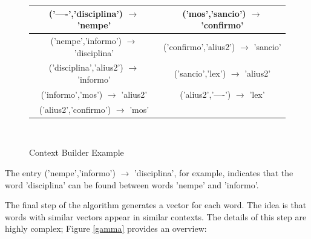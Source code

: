 \documentclass[a4paper, 12pt,notitlepage]{article} %
\newenvironment{figurecenter}{%
	\setlength\topsep{-7pt}
	\setlength\parskip{-7pt}
	\singlespacing %
	\begin{center}
	}{%
	\end{center}
\vspace{-5pt}
}
\numberwithin{dummy}{subsection}
\numberwithin{dummy}{section}
\theoremstyle{named}
\theoremstyle{definition}
\theoremstyle{definition}
\begin{document}
\begin{figure}[H]
	\begin{figurecenter}
		\begin{tabular}{| c | c |}
			\hline
			{\ttfamily ('----','disciplina')} $\rightarrow$ {\ttfamily 'nempe'} & {\ttfamily ('mos','sancio')} $\rightarrow$ {\ttfamily 'confirmo'} \\ \hline
			{\ttfamily ('nempe','informo')} $\rightarrow$ {\ttfamily 'disciplina'} & {\ttfamily ('confirmo','alius2')} $\rightarrow$ {\ttfamily 'sancio'}   \\ \hline
			{\ttfamily ('disciplina','alius2')} $\rightarrow$ {\ttfamily 'informo'} & {\ttfamily ('sancio','lex')} $\rightarrow$ {\ttfamily 'alius2'}   \\ \hline
			{\ttfamily ('informo','mos')} $\rightarrow$ {\ttfamily 'alius2'} & {\ttfamily ('alius2','----')} $\rightarrow$ {\ttfamily 'lex'}    \\ \hline
			{\ttfamily ('alius2','confirmo')} $\rightarrow$ {\ttfamily 'mos'} &    \\ \hline
		\end{tabular}\\
		\caption{Context Builder Example}
		\label{beta}
	\end{figurecenter}
\end{figure}

\noindent The entry {\ttfamily ('nempe','informo')} $\rightarrow$ {\ttfamily 'disciplina'}, for example, indicates that the word {\ttfamily 'disciplina'} can be found between words {\ttfamily 'nempe'} and {\ttfamily 'informo'}. %

The final step of the algorithm generates a vector for each word. The idea is that words with similar vectors appear in similar contexts. The details of this step are highly complex; Figure \ref{gamma} provides an overview:
\end{document}
